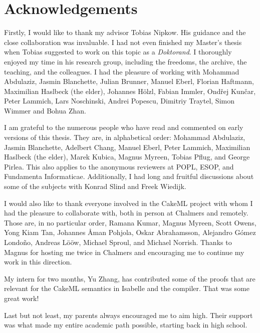 
\section*{Acknowledgements}

{

\setlength\parindent{0pt}
\setlength{\parskip}{10pt}

Firstly, I would like to thank my advisor Tobias Nipkow.
His guidance and the close collaboration was invaluable.
I had not even finished my Master's thesis when Tobias suggested to work on this topic as a \emph{Doktorand}.
I thoroughly enjoyed my time in his research group, including the freedoms, the archive, the teaching, and the colleagues.
I had the pleasure of working with Mohammad Abdulaziz, Jasmin Blanchette, Julian Brunner, Manuel Eberl, Florian Haftmann, Maximilian Haslbeck (the elder), Johannes Hölzl, Fabian Immler, Ondřej Kunčar, Peter Lammich, Lars Noschinski, Andrei Popescu, Dimitriy Traytel, Simon Wimmer and Bohua Zhan.

I am grateful to the numerous people who have read and commented on early versions of this thesis.
They are, in alphabetical order:
Mohammad Abdulaziz, Jasmin Blanchette, Adelbert Chang, Manuel Eberl, Peter Lammich, Maximilian Haslbeck (the elder), Marek Kubica, Magnus Myreen, Tobias Pflug, and George Pirlea.
This also applies to the anonymous reviewers at POPL, ESOP, and Fundamenta Informaticae.
Additionally, I had long and fruitful discussions about some of the subjects with Konrad Slind and Freek Wiedijk.

I would also like to thank everyone involved in the CakeML project with whom I had the pleasure to collaborate with, both in person at Chalmers and remotely.
Those are, in no particular order, Ramana Kumar, Magnus Myreen, Scott Owens, Yong Kiam Tan, Johannes Åman Pohjola, Oskar Abrahamsson, Alejandro Gómez Londoño, Andreas Lööw, Michael Sproul, and Michael Norrish.
Thanks to Magnus for hosting me twice in Chalmers and encouraging me to continue my work in this direction.

My intern for two months, Yu Zhang, has contributed some of the proofs that are relevant for the CakeML semantics in Isabelle and the compiler.
That was some great work!

Last but not least, my parents always encouraged me to aim high.
Their support was what made my entire academic path possible, starting back in high school.

}

\clearpage

\thispagestyle{empty}
\phantom{ }
